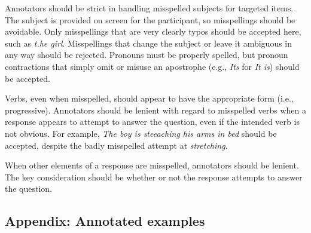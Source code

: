 \documentclass[12pt,notitlepage]{article}
\begin{document}
Annotators should be strict in handling misspelled subjects for targeted items. The subject is provided on screen for the participant, so misspellings should be avoidable. Only misspellings that are very clearly typos should be accepted here, such as \textit{t.he girl}. Misspellings that change the subject or leave it ambiguous in any way should be rejected. Pronouns must be properly spelled, but pronoun contractions that simply omit or misuse an apostrophe (e.g., \textit{Its} for \textit{It is}) should be accepted.

Verbs, even when misspelled, should appear to have the appropriate form (i.e., progressive). Annotators should be lenient with regard to misspelled verbs when a response appears to attempt to answer the question, even if the intended verb is not obvious. For example, \textit{The boy is steeaching his arms in bed} should be accepted, despite the badly misspelled attempt at \textit{stretching}.

When other elements of a response are misspelled, annotators should be lenient. The key consideration should be whether or not the response attempts to answer the question.

\clearpage

\subsection{Appendix: Annotated examples}
\end{document}
